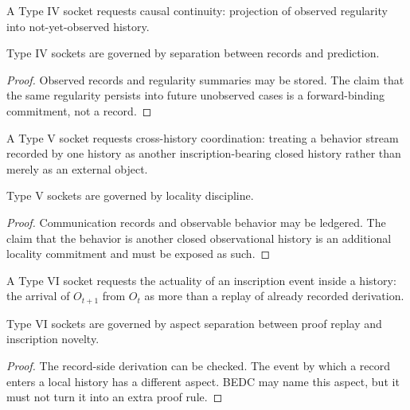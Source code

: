 \begin{definition}
\label{def:philosophy-type-iv-socket}
A Type IV socket requests causal continuity: projection of observed
regularity into not-yet-observed history.
\end{definition}

\begin{theorem}
\label{thm:philosophy-type-iv-gate}
Type IV sockets are governed by separation between records and
prediction.
\end{theorem}
\begin{proof}
Observed records and regularity summaries may be stored. The claim that
the same regularity persists into future unobserved cases is a
forward-binding commitment, not a record.
\end{proof}

\begin{definition}
\label{def:philosophy-type-v-socket}
A Type V socket requests cross-history coordination: treating a
behavior stream recorded by one history as another inscription-bearing
closed history rather than merely as an external object.
\end{definition}

\begin{theorem}
\label{thm:philosophy-type-v-gate}
Type V sockets are governed by locality discipline.
\end{theorem}
\begin{proof}
Communication records and observable behavior may be ledgered. The
claim that the behavior is another closed observational history is an
additional locality commitment and must be exposed as such.
\end{proof}

\begin{definition}
\label{def:philosophy-type-vi-socket}
A Type VI socket requests the actuality of an inscription event inside
a history: the arrival of \(O_{t+1}\) from \(O_t\) as more than a
replay of already recorded derivation.
\end{definition}

\begin{theorem}
\label{thm:philosophy-type-vi-gate}
Type VI sockets are governed by aspect separation between proof replay
and inscription novelty.
\end{theorem}
\begin{proof}
The record-side derivation can be checked. The event by which a record
enters a local history has a different aspect. BEDC may name this
aspect, but it must not turn it into an extra proof rule.
\end{proof}

